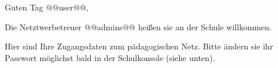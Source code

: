 Guten Tag @@user@@,

\vspace{2mm}

Die Netztwerbetreuer @@admins@@ heißen sie an der Schule willkommen.

\vspace{2mm}

Hier sind Ihre Zugangsdaten zum pädagogischen Netz. Bitte ändern sie ihr Passwort möglichst bald in der Schulkonsole (siehe unten). 


